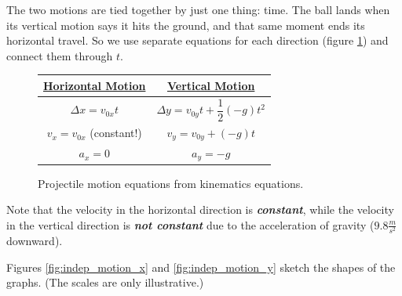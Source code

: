 The two motions are tied together by just one thing: time. The ball lands
when its vertical motion says it hits the ground, and that same moment ends
its horizontal travel. So we use separate equations for each direction
(figure \ref{independenceOfMotionEqs}) and connect them through $t$.
\begin{figure}
    \centering
    \begin{tabular}{|c|c|}
        \hline
        \underline{Horizontal Motion} & \underline{Vertical Motion} \\
        \hline
        $\Delta x = v_{0x} t$ & $\Delta y = v_{0y} t + \dfrac{1}{2}(-g)t^2$ \\
        $v_x = v_{0x}$ (constant!) & $v_y = v_{0y} + (-g)t$ \\
        $a_x = 0$ & $a_y = -g$ \\
        \hline
    \end{tabular}
    \caption{Projectile motion equations from kinematics equations. }\label{independenceOfMotionEqs}
\end{figure}
Note that the velocity in the horizontal direction is \emph{\textbf{constant}}, while the velocity in the vertical direction is \emph{\textbf{not constant}} due to the acceleration of gravity ($9.8 \frac{m}{s^2}$ downward).

Figures \ref{fig:indep_motion_x} and \ref{fig:indep_motion_y} sketch the
shapes of the graphs. (The scales are only illustrative.)

